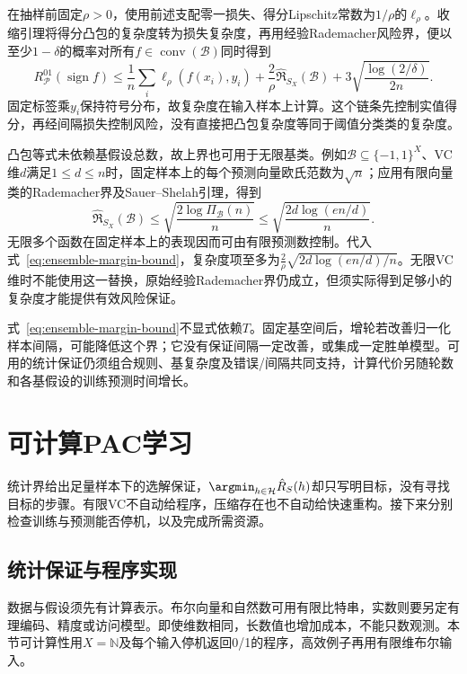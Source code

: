 在抽样前固定$\rho>0$，使用前述支配零一损失、得分Lipschitz常数为$1/\rho$的$\ell_\rho$。收缩引理将得分凸包的复杂度转为损失复杂度，再用经验Rademacher风险界，便以至少$1-\delta$的概率对所有$f\in\operatorname{conv}(\mathcal B)$同时得到
\begin{equation}
 R_{\mathcal P}^{01}(\operatorname{sign}f)
 \leq\frac1n\sum_i\ell_\rho(f(x_i),y_i)
 +\frac{2}{\rho}\widehat{\mathfrak R}_{S_X}(\mathcal B)
 +3\sqrt{\frac{\log(2/\delta)}{2n}}.
 \label{eq:ensemble-margin-bound}
\end{equation}
固定标签乘$y_i$保持符号分布，故复杂度在输入样本上计算。这个链条先控制实值得分，再经间隔损失控制风险，没有直接把凸包复杂度等同于阈值分类类的复杂度。

凸包等式未依赖基假设总数，故上界也可用于无限基类。例如$\mathcal B\subseteq\{-1,1\}^X$、VC维$d$满足$1\leq d\leq n$时，固定样本上的每个预测向量欧氏范数为$\sqrt n$；应用有限向量类的Rademacher界及Sauer--Shelah引理，得到
\[
 \widehat{\mathfrak R}_{S_X}(\mathcal B)
 \leq\sqrt{\frac{2\log\Pi_{\mathcal B}(n)}{n}}
 \leq\sqrt{\frac{2d\log(en/d)}{n}}.
\]
无限多个函数在固定样本上的表现因而可由有限预测数控制。代入式~\eqref{eq:ensemble-margin-bound}，复杂度项至多为$\frac{2}{\rho}\sqrt{2d\log(en/d)/n}$。无限VC维时不能使用这一替换，原始经验Rademacher界仍成立，但须实际得到足够小的复杂度才能提供有效风险保证。

式~\eqref{eq:ensemble-margin-bound}不显式依赖$T$。固定基空间后，增轮若改善归一化样本间隔，可能降低这个界；它没有保证间隔一定改善，或集成一定胜单模型。可用的统计保证仍须组合规则、基复杂度及错误/间隔共同支持，计算代价另随轮数和各基假设的训练预测时间增长。

\section{可计算PAC学习}
\label{sec:computable-binary-learning}

统计界给出足量样本下的选解保证，$\argmin_{h\in\mathcal H}\hat R_S(h)$却只写明目标，没有寻找目标的步骤。有限VC不自动给程序，压缩存在也不自动给快速重构。接下来分别检查训练与预测能否停机，以及完成所需资源。

\subsection{统计保证与程序实现}

数据与假设须先有计算表示。布尔向量和自然数可用有限比特串，实数则要另定有理编码、精度或访问模型。即使维数相同，长数值也增加成本，不能只数观测。本节可计算性用$X=\mathbb N$及每个输入停机返回0/1的程序，高效例子再用有限维布尔输入。

